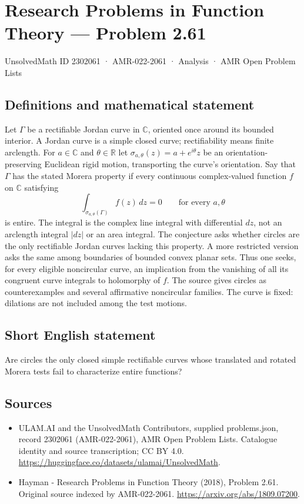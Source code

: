 \documentclass[11pt,a4paper]{article}
\begin{document}
\section*{Research Problems in Function Theory — Problem 2.61}\label{2302061}
{\small UnsolvedMath ID 2302061 · AMR-022-2061 · Analysis · AMR Open Problem Lists}
\subsection{Definitions and mathematical statement}
Let $\Gamma$ be a rectifiable Jordan curve in $\mathbb C$, oriented once around its bounded interior. A Jordan curve is a simple closed curve; rectifiability means finite arclength. For $a\in\mathbb C$ and $\theta\in\mathbb R$ let
$\sigma_{a,\theta}(z)=a+e^{i\theta}z$ be an orientation-preserving Euclidean rigid motion, transporting the curve's orientation.
Say that $\Gamma$ has the stated Morera property if every continuous complex-valued function $f$ on $\mathbb C$ satisfying
\[
\int_{\sigma_{a,\theta}(\Gamma)} f(z)\,dz=0
\qquad\text{for every }a,\theta
\]
is entire. The integral is the complex line integral with differential $dz$, not an arclength integral $|dz|$ or an area integral.
The conjecture asks whether circles are the only rectifiable Jordan curves lacking this property. A more restricted version asks the same among boundaries of bounded convex planar sets. Thus one seeks, for every eligible noncircular curve, an implication from the vanishing of all its congruent curve integrals to holomorphy of $f$. The source gives circles as counterexamples and several affirmative noncircular families. The curve is fixed: dilations are not included among the test motions.
\subsection{Short English statement}
Are circles the only closed simple rectifiable curves whose translated and rotated Morera tests fail to characterize entire functions?
\subsection{Sources}
\begin{itemize}
\item[S1] ULAM.AI and the UnsolvedMath Contributors, supplied problems.json, record 2302061 (AMR-022-2061), AMR Open Problem Lists. Catalogue identity and source transcription; CC BY 4.0.
\url{https://huggingface.co/datasets/ulamai/UnsolvedMath}.
\item[S2] Hayman - Research Problems in Function Theory (2018), Problem 2.61. Original source indexed by AMR-022-2061.
\url{https://arxiv.org/abs/1809.07200}.
\end{itemize}
\end{document}
